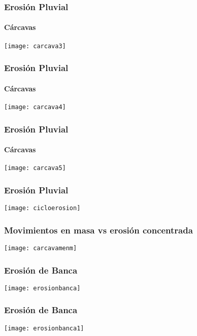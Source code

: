 \documentclass{beamer}
\begin{document}
\begin{frame}
\frametitle{Erosión Pluvial}
\framesubtitle{Cárcavas}
\begin{center}
\texttt{[image: carcava3]}
\end{center}
\end{frame}
\begin{frame}
\frametitle{Erosión Pluvial}
\framesubtitle{Cárcavas}
\begin{center}
\texttt{[image: carcava4]}
\end{center}
\end{frame}
\begin{frame}
\frametitle{Erosión Pluvial}
\framesubtitle{Cárcavas}
\begin{center}
\texttt{[image: carcava5]}
\end{center}
\end{frame}
\begin{frame}
\frametitle{Erosión Pluvial}
\begin{center}
\texttt{[image: cicloerosion]}
\end{center}
\end{frame}
\begin{frame}
\frametitle{Movimientos en masa vs erosión concentrada}
\begin{center}
\texttt{[image: carcavamenm]}
\end{center}
\end{frame}
\begin{frame}
\frametitle{Erosión de Banca}
\begin{center}
\texttt{[image: erosionbanca]}
\end{center}
\end{frame}
\begin{frame}
\frametitle{Erosión de Banca}
\begin{center}
\texttt{[image: erosionbanca1]}
\end{center}
\end{frame}
\end{document}
